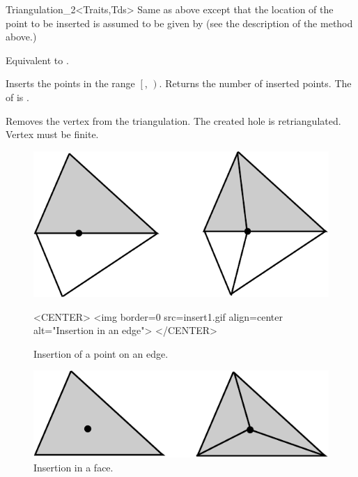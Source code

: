 \begin{ccRefClass}{Triangulation_2<Traits,Tds>}
{Same as above except that the location of the point
  to be inserted is assumed to be given by
 (see the description of the  method above.)}

{Equivalent to .}

{Inserts the points in the range
 $\left[\right.$, $\left.\right)$.
 Returns the number of inserted points.
 \ccPrecond The  of 
 is .}

{Removes the vertex from the triangulation. The created hole is 
 retriangulated.
 \ccPrecond Vertex  must be finite.}


\begin{figure}
\begin{ccTexOnly}
\begin{center}
\includegraphics{Triangulation_2/insert1}
\end{center}
\end{ccTexOnly}
\caption{Insertion of a point on an edge.
\label{Triangulation_ref_Fig_inser1t}}

\begin{ccHtmlOnly}
<CENTER>
<img border=0 src=insert1.gif align=center alt="Insertion in an edge">
</CENTER>
\end{ccHtmlOnly}
\end{figure}




\begin{figure}
\begin{ccTexOnly}
\begin{center}
\includegraphics{Triangulation_2/insert2}
\end{center}
\end{ccTexOnly}
\caption{Insertion in a face.
\label{Triangulation_ref_Fig_insert2}}


\end{figure}
\end{ccRefClass}
